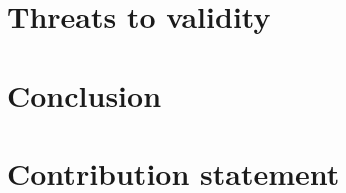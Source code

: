 \documentclass[11pt]{article}
\begin{document}
\section{Threats to validity}  %

\section{Conclusion}  %

\section*{Contribution statement}  %

\appendix
\end{document}
